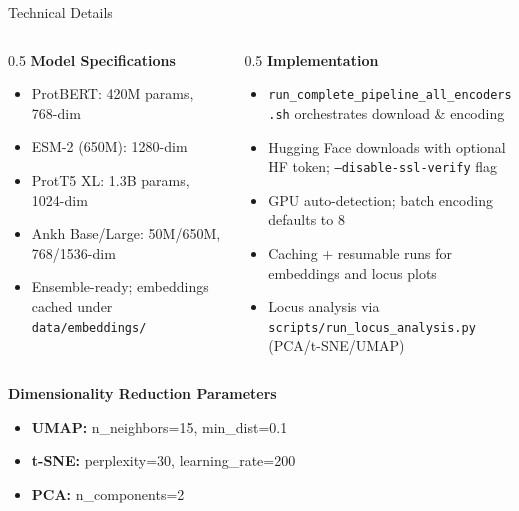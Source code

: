 \documentclass[aspectratio=169]{beamer}
\begin{document}
\begin{frame}{Technical Details}
  \begin{columns}
    \begin{column}{0.5\textwidth}
      \textbf{Model Specifications}
      \begin{itemize}\small
        \item ProtBERT: 420M params, 768-dim
        \item ESM-2 (650M): 1280-dim
        \item ProtT5 XL: 1.3B params, 1024-dim
        \item Ankh Base/Large: 50M/650M, 768/1536-dim
        \item Ensemble-ready; embeddings cached under \texttt{data/embeddings/\*}
      \end{itemize}
    \end{column}
    \begin{column}{0.5\textwidth}
      \textbf{Implementation}
      \begin{itemize}\small
        \item \texttt{run\_complete\_pipeline\_all\_encoders.sh} orchestrates download \& encoding
        \item Hugging Face downloads with optional HF token; \texttt{--disable-ssl-verify} flag
        \item GPU auto-detection; batch encoding defaults to 8
        \item Caching + resumable runs for embeddings and locus plots
        \item Locus analysis via \texttt{scripts/run\_locus\_analysis.py} (PCA/t-SNE/UMAP)
      \end{itemize}
    \end{column}
  \end{columns}
  
  \textbf{Dimensionality Reduction Parameters}
  \begin{itemize}\small
    \item \textbf{UMAP:} n\_neighbors=15, min\_dist=0.1
    \item \textbf{t-SNE:} perplexity=30, learning\_rate=200
    \item \textbf{PCA:} n\_components=2
  \end{itemize}
\end{frame}
\end{document}
